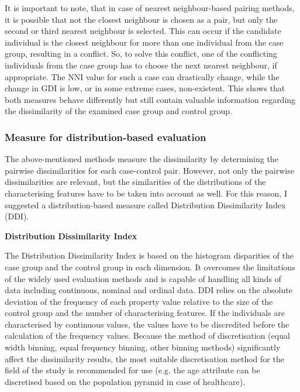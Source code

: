 It is important to note, that in case of nearest neighbour-based pairing methods, it is possible that not the closest neighbour is chosen as a pair, but only the second or third nearest neighbour is selected. This can occur if the candidate individual is the closest neighbour for more than one individual from the case group, resulting in a conflict. So, to solve this conflict, one of the conflicting individuals from the case group has to choose the next nearest neighbour, if appropriate. The NNI value for such a case can drastically change, while the change in GDI is low, or in some extreme cases, non-existent. This shows that both measures behave differently but still contain valuable information regarding the dissimilarity of the examined case group and control group.



\subsubsection{Measure for distribution-based evaluation}
\label{subseq:nonpaired}

The above-mentioned methods measure the dissimilarity by determining the pairwise dissimilarities for each case-control pair. However, not only the pairwise dissimilarities are relevant, but the similarities of the distributions of the characterising features have to be taken into account as well. For this reason, I suggested a distribution-based measure called Distribution Dissimilarity Index (DDI).

\vspace{0.5cm}
\noindent\textbf{Distribution Dissimilarity Index}

\noindent The Distribution Dissimilarity Index is based on the histogram disparities of the case group and the control group in each dimension. It overcomes the limitations of the widely used evaluation methods and is capable of handling all kinds of data including continuous, nominal and ordinal data. DDI relies on the absolute deviation of the frequency of each property value relative to the size of the control group and the number of characterising features. If the individuals are characterised by continuous values, the values have to be discredited before the calculation of the frequency values. Because the method of discretisation (equal width binning, equal frequency binning, other binning methods) significantly affect the dissimilarity results, the most suitable discretisation method for the field of the study is recommended for use (e.g. the age attribute can be discretised based on the population pyramid in case of healthcare).

